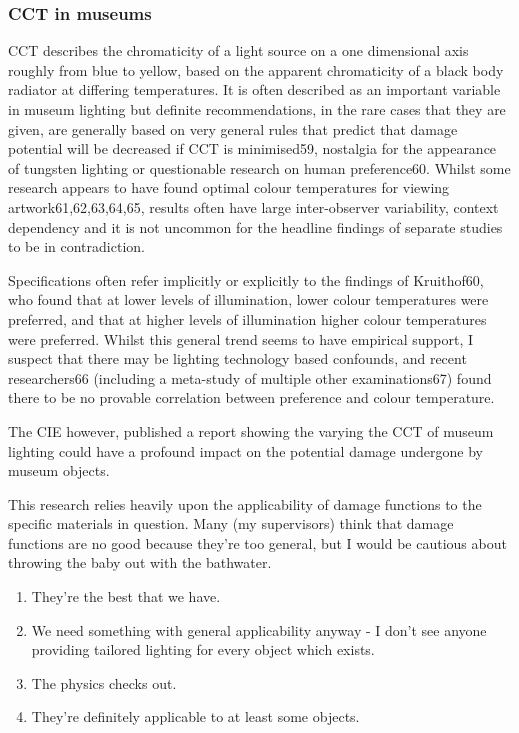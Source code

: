 \subsubsection{CCT in museums}

\acrfull{CCT} describes the chromaticity of a light source on a one dimensional axis roughly from blue to yellow, based on the apparent chromaticity of a black body radiator at differing temperatures. It is often described as an important variable in museum lighting but definite recommendations, in the rare cases that they are given, are generally based on very general rules that predict that damage potential will be decreased if \gls{CCT} is minimised59, nostalgia for the appearance of tungsten lighting or questionable research on human preference60. Whilst some research appears to have found optimal colour temperatures for viewing artwork61,62,63,64,65, results often have large inter-observer variability, context dependency and it is not uncommon for the headline findings of separate studies to be in contradiction. 

Specifications often refer implicitly or explicitly to the findings of Kruithof60, who found that at lower levels of illumination, lower colour temperatures were preferred, and that at higher levels of illumination higher colour temperatures were preferred. Whilst this general trend seems to have empirical support, I suspect that there may be lighting technology based confounds, and recent researchers66 (including a meta-study of multiple other examinations67) found there to be no provable correlation between preference and colour temperature.

The CIE however, published a report showing the varying the \gls{CCT} of museum lighting could have a profound impact on the potential damage undergone by museum objects. 


This research relies heavily upon the applicability of damage functions to the specific materials in question. Many (my supervisors) think that damage functions are no good because they're too general, but I would be cautious about throwing the baby out with the bathwater.

\begin{enumerate}
    \item They're the best that we have.
    \item We need something with general applicability anyway - I don't see anyone providing tailored lighting for every object which exists.
    \item The physics checks out.
    \item They're definitely applicable to at least some objects.
\end{enumerate}


